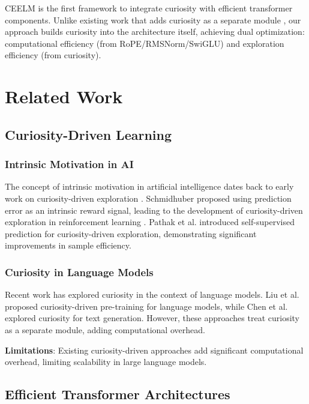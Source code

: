 \documentclass{IEEEtran}
\begin{document}
CEELM is the first framework to integrate curiosity with efficient transformer components. Unlike existing work that adds curiosity as a separate module \cite{pathak2017}, our approach builds curiosity into the architecture itself, achieving dual optimization: computational efficiency (from RoPE/RMSNorm/SwiGLU) and exploration efficiency (from curiosity).

\section{Related Work}

\subsection{Curiosity-Driven Learning}

\subsubsection{Intrinsic Motivation in AI}

The concept of intrinsic motivation in artificial intelligence dates back to early work on curiosity-driven exploration \cite{schmidhuber1991}. Schmidhuber \cite{schmidhuber2010} proposed using prediction error as an intrinsic reward signal, leading to the development of curiosity-driven exploration in reinforcement learning \cite{stadie2015}. Pathak et al. \cite{pathak2017} introduced self-supervised prediction for curiosity-driven exploration, demonstrating significant improvements in sample efficiency.

\subsubsection{Curiosity in Language Models}

Recent work has explored curiosity in the context of language models. Liu et al. \cite{liu2022} proposed curiosity-driven pre-training for language models, while Chen et al. \cite{chen2023} explored curiosity for text generation. However, these approaches treat curiosity as a separate module, adding computational overhead.

\textbf{Limitations}: Existing curiosity-driven approaches add significant computational overhead, limiting scalability in large language models.

\subsection{Efficient Transformer Architectures}
\end{document}
